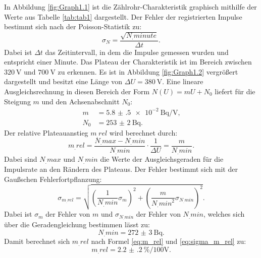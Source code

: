 In Abbildung \ref{fig:Graph1.1} ist die Zählrohr-Charakteristik graphisch mithilfe der Werte aus Tabelle \ref{tab:tab1} dargestellt. Der Fehler der registrierten Impulse bestimmt sich nach der Poisson-Statistik zu:
\begin{equation*}
\sigma_N = \frac{\sqrt{N_.{minute}}}{\Delta t}\text{.}
\end{equation*}
Dabei ist $\Delta t$ das Zeitintervall, in dem die Impulse gemessen wurden und entspricht einer Minute.
Das Plateau der Charakteristik ist im Bereich zwischen $\SI{320}{\volt}$ und $\SI{700}{\volt}$ zu erkennen. Es ist in Abbildung \ref{fig:Graph1.2} vergrößert dargestellt und besitzt eine Länge von $\Delta U = \SI{380}{\volt}$.
Eine lineare Ausgleichsrechnung in diesen Bereich der Form $N(U)=mU+N_0$ liefert für die Steigung $m$ und den Achsenabschnitt $N_0$:
\begin{align*}
m 	&= \SI{5.8(5)e-2}{\becquerel\per\volt} \text{,}\\
N_0	&= \SI{253(2)}{\becquerel}\text{.}
\end{align*}   
Der relative Plateauanstieg $m_.{rel}$ wird berechnet durch:
\begin{equation}
m_.{rel} = \frac{N_.{max}-N_.{min}}{N_.{min}}\cdot\frac{1}{\Delta U} = \frac{m}{N_.{min}}\text{.} \label{eq:m_rel}
\end{equation}
Dabei sind $N_.{max}$ und $N_.{min}$ die Werte der Ausgleichsgeraden für die Impulsrate an den Rändern des Plateaus. 
Der Fehler bestimmt sich mit der Gaußschen Fehlerfortpflanzung:
\begin{equation}
\sigma_{m_.{rel}} = \sqrt{\left(\frac{1}{N_.{min}}\sigma_m\right)^2+\left(\frac{m}{N_.{min}^2}\sigma_{N_.{min}}\right)^2}\text{.} \label{eq:sigma_m_rel}
\end{equation}
Dabei ist $\sigma_m$ der Fehler von $m$ und $\sigma_{N_.{min}}$ der Fehler von $N_.{min}$, welches sich über die Geradengleichung bestimmen lässt zu:
\begin{equation*}
N_.{min} = \SI{272(3)}{\becquerel} \text{.}
\end{equation*}
Damit berechnet sich $m_.{rel}$ nach Formel \eqref{eq:m_rel} und \eqref{eq:sigma_m_rel} zu:
\begin{equation*}
m_.{rel} = \SI{2.2(2)}{\%\per 100\volt}\text{.}
\end{equation*}

